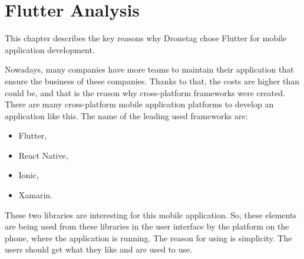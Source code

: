 \chapter{Flutter Analysis}\label{ch:flutter-analysis}

This chapter describes the key reasons why Dronetag chose Flutter for mobile application development.

Nowadays, many companies have more teams to maintain their application that ensure the business of these companies.
Thanks to that, the costs are higher than could be, and that is the reason why cross-platform frameworks were created.
There are many cross-platform mobile application platforms to develop an application like this.
The name of the leading used frameworks are:
\begin{itemize}
    \item Flutter,
    \item React Native,
    \item Ionic,
    \item Xamarin.
\end{itemize}
















These two libraries are interesting for this mobile application.
So, these elements are being used from these libraries in the user interface by the platform on the phone, where the application is running.
The reason for using is simplicity.
The users should get what they like and are used to use.
